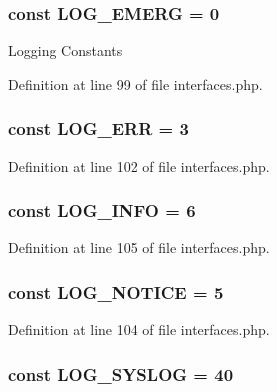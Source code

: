 \hypertarget{interfaceIXLLogger_a1942ba0d2dc43d54ed6539a4785bfd3e}{
\subsubsection[{LOG\_\-EMERG}]{\setlength{\rightskip}{0pt plus 5cm}const {\bf LOG\_\-EMERG} = 0}}
\label{interfaceIXLLogger_a1942ba0d2dc43d54ed6539a4785bfd3e}
Logging Constants 

Definition at line 99 of file interfaces.php.

\hypertarget{interfaceIXLLogger_ade69ae21446f91f019dd33eea3c385c8}{
\subsubsection[{LOG\_\-ERR}]{\setlength{\rightskip}{0pt plus 5cm}const {\bf LOG\_\-ERR} = 3}}
\label{interfaceIXLLogger_ade69ae21446f91f019dd33eea3c385c8}


Definition at line 102 of file interfaces.php.

\hypertarget{interfaceIXLLogger_a951775da27343035f4aa2c323df714f4}{
\subsubsection[{LOG\_\-INFO}]{\setlength{\rightskip}{0pt plus 5cm}const {\bf LOG\_\-INFO} = 6}}
\label{interfaceIXLLogger_a951775da27343035f4aa2c323df714f4}


Definition at line 105 of file interfaces.php.

\hypertarget{interfaceIXLLogger_a6271a91ccd22714d6ef2a50b3e96f976}{
\subsubsection[{LOG\_\-NOTICE}]{\setlength{\rightskip}{0pt plus 5cm}const {\bf LOG\_\-NOTICE} = 5}}
\label{interfaceIXLLogger_a6271a91ccd22714d6ef2a50b3e96f976}


Definition at line 104 of file interfaces.php.

\hypertarget{interfaceIXLLogger_aa7e0b1e59428b3a89b8b03d501805ae9}{
\subsubsection[{LOG\_\-SYSLOG}]{\setlength{\rightskip}{0pt plus 5cm}const {\bf LOG\_\-SYSLOG} = 40}}
\label{interfaceIXLLogger_aa7e0b1e59428b3a89b8b03d501805ae9}


